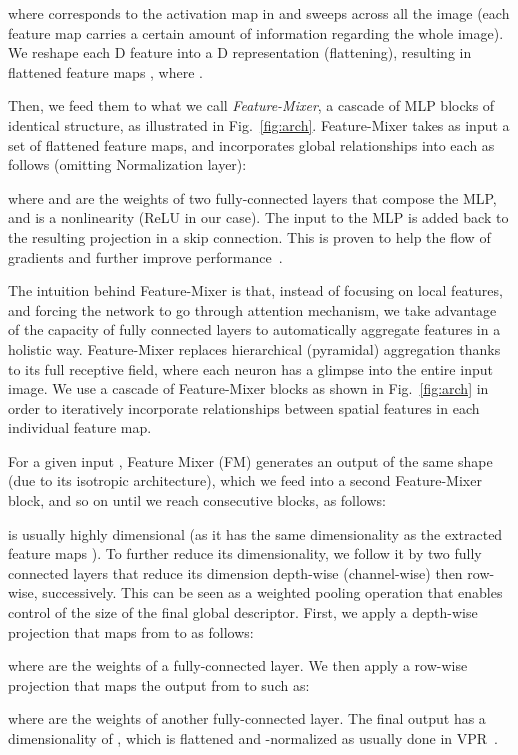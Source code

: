 \documentclass[10pt,twocolumn,letterpaper]{article}
\begin{document}
 where  corresponds to the  activation map in  and sweeps across all the image (each feature map carries a certain amount of information regarding the whole image). We reshape each D feature  into a D representation (flattening), resulting in flattened feature maps , where .

Then, we feed them to what we call \emph{Feature-Mixer}, a cascade of  MLP blocks of identical structure, as illustrated in Fig.~\ref{fig:arch}. Feature-Mixer takes as input a set of flattened feature maps, and incorporates global relationships into each  as follows (omitting Normalization layer):


where  and  are the weights of two fully-connected layers that compose the MLP, and  is a nonlinearity (ReLU in our case). The input to the MLP is added back to the resulting projection in a skip connection. This is proven to help the flow of gradients and further improve performance~\cite{he2016deep}.

The intuition behind Feature-Mixer is that, instead of focusing on local features, and forcing the network  to go through attention mechanism, we take advantage of the capacity of fully connected layers to automatically aggregate features in a holistic way. Feature-Mixer replaces hierarchical (pyramidal) aggregation thanks to its full receptive field, where each neuron has a glimpse into the entire input image. We use a cascade of Feature-Mixer blocks as shown in Fig.~\ref{fig:arch} in order to iteratively incorporate relationships between spatial features in each individual feature map.

For a given input , Feature Mixer (FM) generates an output  of the same shape (due to its isotropic architecture), which we feed into a second Feature-Mixer block, and so on until we reach  consecutive blocks, as follows:


 is usually highly dimensional (as it has the same dimensionality as the extracted feature maps ). To further reduce its dimensionality, we follow it by two fully connected layers that reduce its dimension depth-wise (channel-wise) then row-wise,  successively. This can be seen as a weighted pooling operation that enables control of the size of the final global descriptor.
First, we apply a depth-wise projection that maps  from  to  as follows:

where  are the weights of a fully-connected layer.
We then apply a row-wise projection that maps the output  from  to  such as: 

where  are the weights of another fully-connected layer. The final output  has a dimensionality of , which is flattened and -normalized as usually done in VPR~\cite{arandjelovic2016netvlad, ge2020self, berton2022rethinking}.
\end{document}
